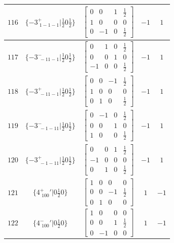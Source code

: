 \documentclass[fleqn,8pt]{jsarticle}
\begin{document}
\begin{longtable}{ccccc}
$ 116 $ & $ \{-3^{+}_{\,\,1-1-1}|\frac{1}{2} 0 \frac{1}{2}\} $ & $ \begin{bmatrix} 0 & 0 & 1 & \frac{1}{2} \\ 1 & 0 & 0 & 0 \\ 0 & -1 & 0 & \frac{1}{2} \end{bmatrix} $ & $ -1 $ & $ 1 $ \\ \hline
$ 117 $ & $ \{-3^{-}_{\,\,-11-1}|\frac{1}{2} 0 \frac{1}{2}\} $ & $ \begin{bmatrix} 0 & 1 & 0 & \frac{1}{2} \\ 0 & 0 & 1 & 0 \\ -1 & 0 & 0 & \frac{1}{2} \end{bmatrix} $ & $ -1 $ & $ 1 $ \\ \hline
$ 118 $ & $ \{-3^{+}_{\,\,-11-1}|\frac{1}{2} 0 \frac{1}{2}\} $ & $ \begin{bmatrix} 0 & 0 & -1 & \frac{1}{2} \\ 1 & 0 & 0 & 0 \\ 0 & 1 & 0 & \frac{1}{2} \end{bmatrix} $ & $ -1 $ & $ 1 $ \\ \hline
$ 119 $ & $ \{-3^{-}_{\,\,-1-11}|\frac{1}{2} 0 \frac{1}{2}\} $ & $ \begin{bmatrix} 0 & -1 & 0 & \frac{1}{2} \\ 0 & 0 & 1 & 0 \\ 1 & 0 & 0 & \frac{1}{2} \end{bmatrix} $ & $ -1 $ & $ 1 $ \\ \hline
$ 120 $ & $ \{-3^{+}_{\,\,-1-11}|\frac{1}{2} 0 \frac{1}{2}\} $ & $ \begin{bmatrix} 0 & 0 & 1 & \frac{1}{2} \\ -1 & 0 & 0 & 0 \\ 0 & 1 & 0 & \frac{1}{2} \end{bmatrix} $ & $ -1 $ & $ 1 $ \\ \hline
$ 121 $ & $ \{4^{+}_{\,\,100}{}'|0 \frac{1}{2} 0\} $ & $ \begin{bmatrix} 1 & 0 & 0 & 0 \\ 0 & 0 & -1 & \frac{1}{2} \\ 0 & 1 & 0 & 0 \end{bmatrix} $ & $ 1 $ & $ -1 $ \\ \hline
$ 122 $ & $ \{4^{-}_{\,\,100}{}'|0 \frac{1}{2} 0\} $ & $ \begin{bmatrix} 1 & 0 & 0 & 0 \\ 0 & 0 & 1 & \frac{1}{2} \\ 0 & -1 & 0 & 0 \end{bmatrix} $ & $ 1 $ & $ -1 $ \\ \hline

\end{longtable}
\end{document}
